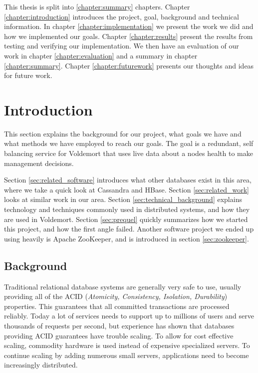 
This thesis is split into \ref{chapter:summary} chapters. Chapter \ref{chapter:introduction} introduces the project, goal, background and technical information. In chapter \ref{chapter:implementation} we present the work we did and how we implemented our goals. Chapter \ref{chapter:results} present the results from testing and verifying our implementation. We then have an evaluation of our work in chapter \ref{chapter:evaluation} and a summary in chapter \ref{chapter:summary}. Chapter \ref{chapter:futurework} presents our thoughts and ideas for future work.

\section{Introduction}
This section explains the background for our project, what goals we have and what methods we have employed to reach our goals. 
The goal is a redundant, self balancing service for Voldemort that uses live data about a nodes health to make management decisions.

Section \ref{sec:related_software} introduces what other databases exist in this area, where we take a quick look at Cassandra and HBase.
Section \ref{sec:related_work} looks at similar work in our area.
Section \ref{sec:technical_background} explains technology and techniques commonly used in distributed systems, and how they are used in Voldemort.
Section \ref{sec:prequel} quickly summarizes how we started this project, and how the first angle failed.
Another software project we ended up using heavily is Apache ZooKeeper, and is introduced in section \ref{sec:zookeeper}.

\subsection{Background}
Traditional relational database systems are generally very safe to use, usually providing all of the ACID (\emph{Atomicity, Consistency, Isolation, Durability}) properties.
This guarantees that all committed transactions are processed reliably. 
Today a lot of services needs to support up to millions of users and serve thousands of requests per second, but experience has shown that databases providing ACID guarantees have trouble scaling. 
To allow for cost effective scaling, commodity hardware is used instead of expensive specialized servers. To continue scaling by adding numerous small servers, applications need to become increasingly distributed.

